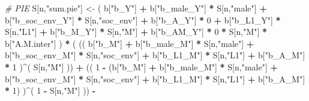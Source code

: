 \documentclass[
]{book}
\newenvironment{Shaded}{\begin{snugshade}}{\end{snugshade}}
\newcommand{\CommentTok}[1]{\textcolor[rgb]{0.56,0.35,0.01}{\textit{#1}}}
\newcommand{\DecValTok}[1]{\textcolor[rgb]{0.00,0.00,0.81}{#1}}
\newcommand{\NormalTok}[1]{#1}
\newcommand{\OtherTok}[1]{\textcolor[rgb]{0.56,0.35,0.01}{#1}}
\newcommand{\SpecialCharTok}[1]{\textcolor[rgb]{0.81,0.36,0.00}{\textbf{#1}}}
\newcommand{\StringTok}[1]{\textcolor[rgb]{0.31,0.60,0.02}{#1}}
\begin{document}
\begin{Shaded}
\begin{Highlighting}[]
    \CommentTok{\# PIE }
\NormalTok{    S[n,}\StringTok{"sum.pie"}\NormalTok{] }\OtherTok{\textless{}{-}}\NormalTok{ ( b[}\StringTok{"b\_Y"}\NormalTok{] }\SpecialCharTok{+} 
\NormalTok{                          b[}\StringTok{"b\_male\_Y"}\NormalTok{] }\SpecialCharTok{*}\NormalTok{ S[n,}\StringTok{"male"}\NormalTok{] }\SpecialCharTok{+} 
\NormalTok{                          b[}\StringTok{"b\_soc\_env\_Y"}\NormalTok{] }\SpecialCharTok{*}\NormalTok{ S[n,}\StringTok{"soc\_env"}\NormalTok{] }\SpecialCharTok{+} 
\NormalTok{                          b[}\StringTok{"b\_A\_Y"}\NormalTok{] }\SpecialCharTok{*} \DecValTok{0} \SpecialCharTok{+} 
\NormalTok{                          b[}\StringTok{"b\_L1\_Y"}\NormalTok{] }\SpecialCharTok{*}\NormalTok{ S[n,}\StringTok{"L1"}\NormalTok{] }\SpecialCharTok{+}
\NormalTok{                          b[}\StringTok{"b\_M\_Y"}\NormalTok{] }\SpecialCharTok{*}\NormalTok{ S[n,}\StringTok{"M"}\NormalTok{] }\SpecialCharTok{+}
\NormalTok{                          b[}\StringTok{"b\_AM\_Y"}\NormalTok{] }\SpecialCharTok{*} \DecValTok{0} \SpecialCharTok{*}\NormalTok{ S[n,}\StringTok{"M"}\NormalTok{] }\SpecialCharTok{*}\NormalTok{ b[}\StringTok{"A.M.inter"}\NormalTok{] ) }\SpecialCharTok{*}
\NormalTok{      ( (( b[}\StringTok{"b\_M"}\NormalTok{] }\SpecialCharTok{+} 
\NormalTok{             b[}\StringTok{"b\_male\_M"}\NormalTok{] }\SpecialCharTok{*}\NormalTok{ S[n,}\StringTok{"male"}\NormalTok{] }\SpecialCharTok{+} 
\NormalTok{             b[}\StringTok{"b\_soc\_env\_M"}\NormalTok{] }\SpecialCharTok{*}\NormalTok{ S[n,}\StringTok{"soc\_env"}\NormalTok{] }\SpecialCharTok{+} 
\NormalTok{             b[}\StringTok{"b\_L1\_M"}\NormalTok{] }\SpecialCharTok{*}\NormalTok{ S[n,}\StringTok{"L1"}\NormalTok{] }\SpecialCharTok{+}
\NormalTok{             b[}\StringTok{"b\_A\_M"}\NormalTok{] }\SpecialCharTok{*} \DecValTok{1}\NormalTok{ )}\SpecialCharTok{\^{}}\NormalTok{( S[n,}\StringTok{"M"}\NormalTok{] )) }\SpecialCharTok{+}
\NormalTok{          (( }\DecValTok{1} \SpecialCharTok{{-}}\NormalTok{ (b[}\StringTok{"b\_M"}\NormalTok{] }\SpecialCharTok{+} 
\NormalTok{                    b[}\StringTok{"b\_male\_M"}\NormalTok{] }\SpecialCharTok{*}\NormalTok{ S[n,}\StringTok{"male"}\NormalTok{] }\SpecialCharTok{+} 
\NormalTok{                    b[}\StringTok{"b\_soc\_env\_M"}\NormalTok{] }\SpecialCharTok{*}\NormalTok{ S[n,}\StringTok{"soc\_env"}\NormalTok{] }\SpecialCharTok{+} 
\NormalTok{                    b[}\StringTok{"b\_L1\_M"}\NormalTok{] }\SpecialCharTok{*}\NormalTok{ S[n,}\StringTok{"L1"}\NormalTok{] }\SpecialCharTok{+}
\NormalTok{                    b[}\StringTok{"b\_A\_M"}\NormalTok{] }\SpecialCharTok{*} \DecValTok{1}\NormalTok{) )}\SpecialCharTok{\^{}}\NormalTok{( }\DecValTok{1} \SpecialCharTok{{-}}\NormalTok{ S[n,}\StringTok{"M"}\NormalTok{] )) }\SpecialCharTok{{-}}

\end{Highlighting}
\end{Shaded}
\end{document}

